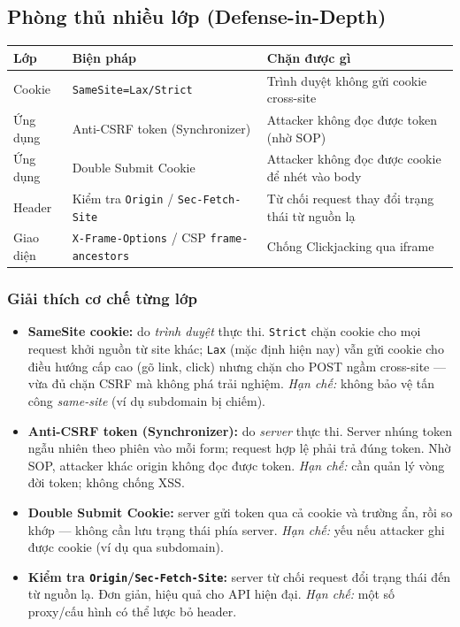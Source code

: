 \documentclass[11pt,a4paper]{article}
\begin{document}
\subsection{Phòng thủ nhiều lớp (Defense-in-Depth)}
\begin{center}\small
\begin{tabularx}{\linewidth}{@{}l Y Y@{}}
\toprule
\textbf{Lớp} & \textbf{Biện pháp} & \textbf{Chặn được gì}\\
\midrule
Cookie & \texttt{SameSite=Lax/Strict} & Trình duyệt không gửi cookie cross-site\\
Ứng dụng & Anti-CSRF token (Synchronizer) & Attacker không đọc được token (nhờ SOP)\\
Ứng dụng & Double Submit Cookie & Attacker không đọc được cookie để nhét vào body\\
Header & Kiểm tra \texttt{Origin} / \texttt{Sec-Fetch-Site} & Từ chối request thay đổi trạng thái từ nguồn lạ\\
Giao diện & \texttt{X-Frame-Options} / CSP \texttt{frame-ancestors} & Chống Clickjacking qua iframe\\
\bottomrule
\end{tabularx}
\end{center}

\subsubsection{Giải thích cơ chế từng lớp}
\begin{itemize}
  \item \textbf{SameSite cookie:} do \emph{trình duyệt} thực thi. \texttt{Strict} chặn cookie cho mọi request khởi nguồn từ site khác; \texttt{Lax} (mặc định hiện nay) vẫn gửi cookie cho điều hướng cấp cao (gõ link, click) nhưng chặn cho POST ngầm cross-site — vừa đủ chặn CSRF mà không phá trải nghiệm. \emph{Hạn chế:} không bảo vệ tấn công \emph{same-site} (ví dụ subdomain bị chiếm).
  \item \textbf{Anti-CSRF token (Synchronizer):} do \emph{server} thực thi. Server nhúng token ngẫu nhiên theo phiên vào mỗi form; request hợp lệ phải trả đúng token. Nhờ SOP, attacker khác origin không đọc được token. \emph{Hạn chế:} cần quản lý vòng đời token; không chống XSS.
  \item \textbf{Double Submit Cookie:} server gửi token qua cả cookie và trường ẩn, rồi so khớp — không cần lưu trạng thái phía server. \emph{Hạn chế:} yếu nếu attacker ghi được cookie (ví dụ qua subdomain).
  \item \textbf{Kiểm tra \texttt{Origin}/\texttt{Sec-Fetch-Site}:} server từ chối request đổi trạng thái đến từ nguồn lạ. Đơn giản, hiệu quả cho API hiện đại. \emph{Hạn chế:} một số proxy/cấu hình có thể lược bỏ header.
\end{itemize}
\end{document}
